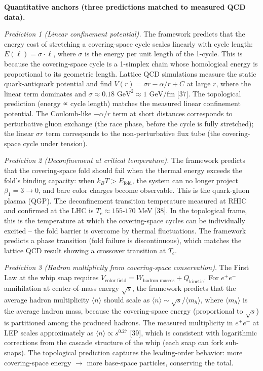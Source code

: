 \documentclass[
  11pt,
]{article}
\begin{document}
\textbf{Quantitative anchors (three predictions matched to measured QCD
data).}

\emph{Prediction 1 (Linear confinement potential).} The framework
predicts that the energy cost of stretching a covering-space cycle
scales linearly with cycle length: \(E(\ell) = \sigma \cdot \ell\),
where \(\sigma\) is the energy per unit length of the 1-cycle. This is
because the covering-space cycle is a 1-simplex chain whose homological
energy is proportional to its geometric length. Lattice QCD simulations
measure the static quark-antiquark potential and find
\(V(r) = \sigma r - \alpha/r + C\) at large \(r\), where the linear term
dominates and
\(\sigma \approx 0.18 \text{ GeV}^2 \approx 1 \text{ GeV/fm}\) {[}37{]}.
The topological prediction (energy ∝ cycle length) matches the measured
linear confinement potential. The Coulomb-like \(-\alpha/r\) term at
short distances corresponds to perturbative gluon exchange (the race
phase, before the cycle is fully stretched); the linear \(\sigma r\)
term corresponds to the non-perturbative flux tube (the covering-space
cycle under tension).

\emph{Prediction 2 (Deconfinement at critical temperature).} The
framework predicts that the covering-space fold should fail when the
thermal energy exceeds the fold's binding capacity: when
\(k_B T > E_{\text{fold}}\), the system can no longer project
\(\beta_1 = 3 \to 0\), and bare color charges become observable. This is
the quark-gluon plasma (QGP). The deconfinement transition temperature
measured at RHIC and confirmed at the LHC is \(T_c \approx 155\)-\(170\)
MeV {[}38{]}. In the topological frame, this is the temperature at which
the covering-space cycles can be individually excited -- the fold
barrier is overcome by thermal fluctuations. The framework predicts a
phase transition (fold failure is discontinuous), which matches the
lattice QCD result showing a crossover transition at \(T_c\).

\emph{Prediction 3 (Hadron multiplicity from covering-space
conservation).} The First Law at the whip snap requires
\(V_{\text{color field}} = W_{\text{hadron masses}} + Q_{\text{kinetic}}\).
For \(e^+e^-\) annihilation at center-of-mass energy \(\sqrt{s}\), the
framework predicts that the average hadron multiplicity
\(\langle n \rangle\) should scale as
\(\langle n \rangle \sim \sqrt{s} / \langle m_h \rangle\), where
\(\langle m_h \rangle\) is the average hadron mass, because the
covering-space energy (proportional to \(\sqrt{s}\)) is partitioned
among the produced hadrons. The measured multiplicity in \(e^+e^-\) at
LEP scales approximately as \(\langle n \rangle \propto s^{0.27}\)
{[}39{]}, which is consistent with logarithmic corrections from the
cascade structure of the whip (each snap can fork sub-snaps). The
topological prediction captures the leading-order behavior: more
covering-space energy \(\to\) more base-space particles, conserving the
total.
\end{document}
